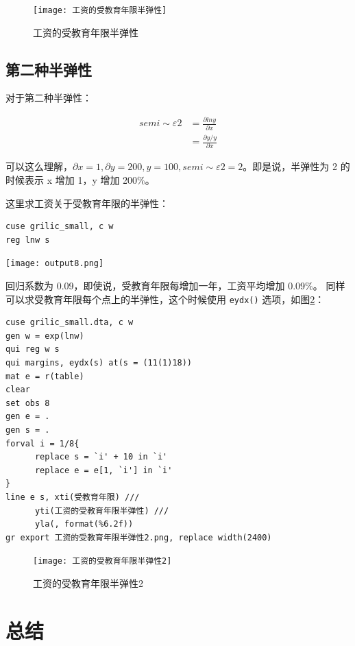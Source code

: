 \documentclass[cn,fancy,blue,11pt]{elegantbook}
\begin{document}
\begin{figure}
  \centering \texttt{[image: 工资的受教育年限半弹性]}
  \caption{工资的受教育年限半弹性}
  \label{fig:wage456}
\end{figure}

\hypertarget{section-27}{%
\subsection{第二种半弹性}\label{section-27}}

对于第二种半弹性：

\begin{align}
  semi\sim\varepsilon 2 &= \frac{\partial lny}{\partial x} \\
  & = \frac{\partial y/y}{\partial x}
\end{align}

可以这么理解，\(\partial x = 1, \partial y = 200, y =100, semi \sim \varepsilon 2 = 2\)。即是说，半弹性为 2 的时候表示 x 增加 1，y 增加 200\%。

这里求工资关于受教育年限的半弹性：

\begin{lstlisting}
cuse grilic_small, c w
reg lnw s
\end{lstlisting}

\noindent\texttt{[image: output8.png]}

回归系数为 0.09，即使说，受教育年限每增加一年，工资平均增加 0.09\%。
同样可以求受教育年限每个点上的半弹性，这个时候使用 \lstinline{eydx()} 选项，如图\ref{fig:wage4562}：

\begin{lstlisting}
cuse grilic_small.dta, c w
gen w = exp(lnw)
qui reg w s
qui margins, eydx(s) at(s = (11(1)18))
mat e = r(table)
clear
set obs 8
gen e = .
gen s = .
forval i = 1/8{
      replace s = `i' + 10 in `i'
      replace e = e[1, `i'] in `i'
}
line e s, xti(受教育年限) ///
      yti(工资的受教育年限半弹性) ///
      yla(, format(%6.2f))
gr export 工资的受教育年限半弹性2.png, replace width(2400)
\end{lstlisting}

\begin{figure}
  \centering
  \texttt{[image: 工资的受教育年限半弹性2]}
  \caption{工资的受教育年限半弹性2}
  \label{fig:wage4562}
\end{figure}

\hypertarget{section-28}{%
\section{总结}\label{section-28}}
\end{document}
